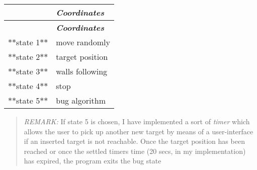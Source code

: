 \tabulinesep=1mm
\begin{longtabu} spread 0pt [c]{*2{|X[-1]}|}
\hline
{}&{\bf {\itshape Coordinates}  }\\
\endfirsthead
\hline
\endfoot
\hline
{}&{\bf {\itshape Coordinates}  }\\
\endhead
$\ast$$\ast$state 1$\ast$$\ast$ &move randomly \\
$\ast$$\ast$state 2$\ast$$\ast$ &target position \\
$\ast$$\ast$state 3$\ast$$\ast$ &walls following \\
$\ast$$\ast$state 4$\ast$$\ast$ &stop \\
$\ast$$\ast$state 5$\ast$$\ast$ &bug algorithm \\
\end{longtabu}
\begin{quote}
{\itshape R\+E\+M\+A\+RK\+:} If {\ttfamily state 5} is chosen, I have implemented a sort of {\itshape timer} which allows the user to pick up another new target by means of a user-\/interface if an inserted target is not reachable. Once the target position has been reached or once the settled timer\textquotesingle{}s time (20 secs, in my implementation) has expired, the program exits the bug state \end{quote}



